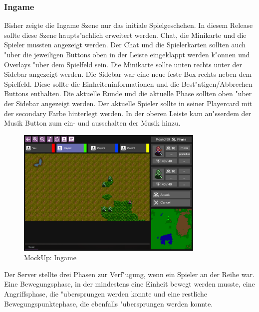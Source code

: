 \documentclass[12pt, titlepage]{scrartcl}
\newcounter{subsubsubsection}[subsubsection]
\begin{document}
		    \subsubsection{Ingame}
		        Bisher zeigte die Ingame Szene nur das initiale Spielgeschehen. In diesem Release sollte diese Szene haupts"achlich erweitert werden. Chat, die Minikarte und die Spieler mussten angezeigt werden. Der Chat und die Spielerkarten sollten auch "uber die jeweiligen Buttons oben in der Leiste eingeklappt werden k"onnen und Overlays "uber dem Spielfeld sein. Die Minikarte sollte unten rechts unter der Sidebar angezeigt werden. Die Sidebar war eine neue feste Box rechts neben dem Spielfeld. Diese sollte die Einheiteninformationen und die Best"atigen/Abbrechen Buttons enthalten. Die aktuelle Runde und die aktuelle Phase sollten oben "uber der Sidebar angezeigt werden. Der aktuelle Spieler sollte in seiner Playercard mit der secondary Farbe hinterlegt werden. In der oberen Leiste kam au"sserdem der Musik Button zum ein- und ausschalten der Musik hinzu. \\
		        \begin{figure}[H] 
    				\centering
    				\includegraphics[width=0.8\textwidth]{images/mockUps/Ingame.png}
    				\caption{MockUp: Ingame}
    				\label{Ingame_View}
			    \end{figure}
			        Der Server stellte drei Phasen zur Verf"ugung, wenn ein Spieler an der Reihe war. Eine Bewegungsphase, in der mindestens eine Einheit bewegt werden musste, eine Angriffsphase, die "ubersprungen werden konnte und eine restliche Bewegungspunktephase, die ebenfalls "ubersprungen werden konnte. \\
\end{document}
